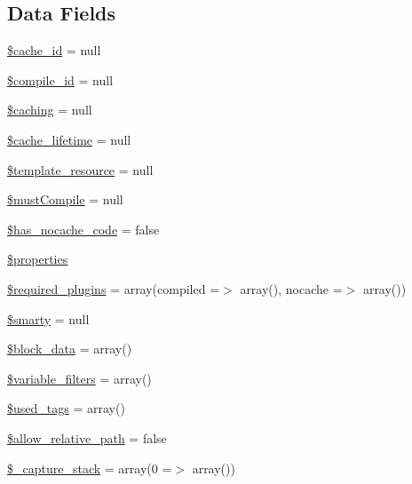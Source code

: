\subsection*{Data Fields}
\begin{DoxyCompactItemize}
\item 
\hyperlink{class_smarty___internal___template_aabdcf0100ec4fce78371b883f0c6cbf8}{\$cache\+\_\+id} = null
\item 
\hyperlink{class_smarty___internal___template_a4c29af6f98e3049de95861b01a7bb00d}{\$compile\+\_\+id} = null
\item 
\hyperlink{class_smarty___internal___template_aa36073c4cda5c97981a5b99ca92208be}{\$caching} = null
\item 
\hyperlink{class_smarty___internal___template_a5aaab753f75170fa670cbb602aa97119}{\$cache\+\_\+lifetime} = null
\item 
\hyperlink{class_smarty___internal___template_a93dbc9fc2973c09e307929d7cce4dff3}{\$template\+\_\+resource} = null
\item 
\hyperlink{class_smarty___internal___template_a9faa5e2c2d86463859252cc6962ed9a0}{\$must\+Compile} = null
\item 
\hyperlink{class_smarty___internal___template_af066b23afeb4851b156a56d2144404a8}{\$has\+\_\+nocache\+\_\+code} = false
\item 
\hyperlink{class_smarty___internal___template_a7f675de4b5983d7e84f6573b7d4d453d}{\$properties}
\item 
\hyperlink{class_smarty___internal___template_a32340eba5b892ce9cf8c124940a6621e}{\$required\+\_\+plugins} = array(\textquotesingle{}compiled\textquotesingle{} =$>$ array(), \textquotesingle{}nocache\textquotesingle{} =$>$ array())
\item 
\hyperlink{class_smarty___internal___template_ac3ae29e9ccbb2006fa26fd9eb2c12117}{\$smarty} = null
\item 
\hyperlink{class_smarty___internal___template_aa12db754a4294b35c1d31de165cd675a}{\$block\+\_\+data} = array()
\item 
\hyperlink{class_smarty___internal___template_a52837a08ed9b9dfab552bd427c231c88}{\$variable\+\_\+filters} = array()
\item 
\hyperlink{class_smarty___internal___template_a724bb7a42f1d86f6844534ac644ac210}{\$used\+\_\+tags} = array()
\item 
\hyperlink{class_smarty___internal___template_acd9d4cf10ce12a475bffdb3708264047}{\$allow\+\_\+relative\+\_\+path} = false
\item 
\hyperlink{class_smarty___internal___template_a432edd60bdfac5d87814fb00c2661b20}{\$\+\_\+capture\+\_\+stack} = array(0 =$>$ array())
\end{DoxyCompactItemize}



